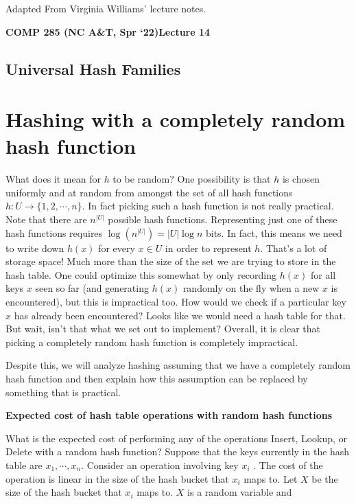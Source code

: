 \documentclass [12pt]{article}
\begin{document}
 

\vspace {1em} 
\begin {Instruction} 
Adapted From Virginia Williams' lecture notes.
\end {Instruction}  

{\LARGE \textbf {COMP 285 (NC A\&T, Spr `22)}\hfill \textbf {Lecture 14} } 

\begin{centering}
\section*{Universal Hash Families}
\end{centering}

\section{Hashing with a completely random hash function}

What does it mean for $h$ to be random? One possibility is that $h$ is chosen uniformly and at random from amongst the set of all hash functions $h : U \rightarrow \{1, 2, \cdots , n\}$. In fact picking such a hash function is not really practical. Note that there are $n^{|U|}$ possible hash functions. Representing just one of these hash functions requires $\log ( n^{|U|} ) = |U|\log n$ bits. In fact, this means we need to write down $h(x)$ for every $x \in U$ in order to represent $h$. That's a lot of storage space! Much more than the size of the set we are trying to store in the hash table. One could optimize this somewhat by only recording $h(x)$ for all keys $x$ seen so far (and generating $h(x)$ randomly on the fly when a new $x$ is encountered), but this is impractical too. How would we check if a particular key $x$ has already been encountered? Looks like we would need a hash table for that. But wait, isn't that what we set out to implement? Overall, it is clear that picking a completely random hash function is completely impractical.

Despite this, we will analyze hashing assuming that we have a completely random hash function and then explain how this assumption can be replaced by something that is practical.

\textbf{Expected cost of hash table operations with random hash functions} 

What is the expected cost of performing any of the operations Insert, Lookup, or Delete with a random hash function? Suppose that the keys currently in the hash table are $x_1, \cdots, x_n$. Consider an operation involving key $x_i$ . The cost of the operation is linear in the size of the hash bucket that $x_i$ maps to. Let $X$ be the size of the hash bucket that $x_i$ maps to. $X$ is a random variable and
\end{document}

